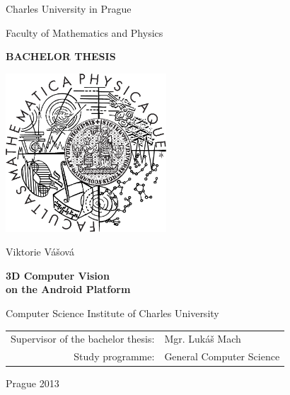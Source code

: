 \documentclass[12pt,a4paper]{report}
\begin{document}


\pagestyle{empty}
\begin{center}

\large

Charles University in Prague

\medskip

Faculty of Mathematics and Physics

\vfill

{\bf\Large BACHELOR THESIS}

\vfill

\centerline{\mbox{\includegraphics[width=60mm]{img/logo.pdf}}}

\vfill
\vspace{5mm}

{\LARGE Viktorie Vášová}

\vspace{15mm}

{\LARGE\bfseries 3D Computer Vision \\ on the Android Platform}

\vfill

Computer Science Institute of Charles University

\vfill

\begin{tabular}{rl}

Supervisor of the bachelor thesis: & Mgr. Lukáš Mach \\
\noalign{\vspace{2mm}}
Study programme: & General Computer Science \\
\end{tabular}

\vfill

Prague 2013

\end{center}
\end{document}
